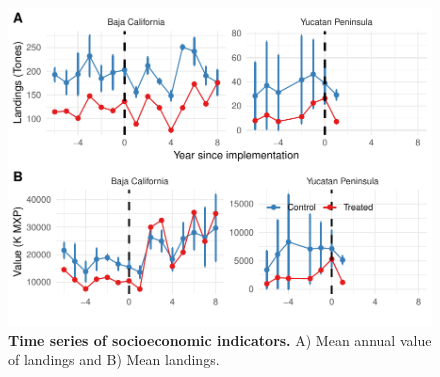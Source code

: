 \documentclass[10pt]{article}
\begin{document}
\clearpage

\begin{figure}[h]
\centering
\includegraphics{img/S5_fig.pdf}
\caption{{\bf Time series of socioeconomic indicators.} A) Mean annual value of landings and B) Mean landings.}
\end{figure}

\clearpage
\end{document}
